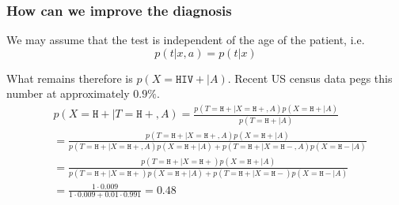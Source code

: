 \documentclass[notheorems, aspectratio=54]{beamer}
\def\parchmentframe#1{
		\tikz{
			\node[inner sep=1em] (A) {#1};  %
			\begin{pgfonlayer}{background}  %
				\fill[normal border] 
				(A.south east) -- (A.south west) -- 
				(A.north west) -- (A.north east) -- cycle;
	\end{pgfonlayer}}}
\def\parchmentframetop#1{
		\tikz{
			\node[inner sep=2em] (A) {#1};    %
			\begin{pgfonlayer}{background}    
				\fill[normal border]              %
				(A.south east) -- (A.south west) -- 
				(A.north west) -- (A.north east) -- cycle;
				\fill[torn border]                %
				($(A.south east)-(0,.2)$) -- ($(A.south west)-(0,.2)$) -- 
				($(A.south west)+(0,.2)$) -- ($(A.south east)+(0,.2)$) -- cycle;
	\end{pgfonlayer}}}
\def\parchmentframebottom#1{
		\tikz{
			\node[inner sep=2em] (A) {#1};   %
			\begin{pgfonlayer}{background}   
				\fill[normal border]             %
				(A.south east) -- (A.south west) -- 
				(A.north west) -- (A.north east) -- cycle;
				\fill[torn border]               %
				($(A.north east)-(0,.2)$) -- ($(A.north west)-(0,.2)$) -- 
				($(A.north west)+(0,.2)$) -- ($(A.north east)+(0,.2)$) -- cycle;
	\end{pgfonlayer}}}
\def\parchmentframemiddle#1{
		\tikz{
			\node[inner sep=2em] (A) {#1};   %
			\begin{pgfonlayer}{background}   
				\fill[normal border]             %
				(A.south east) -- (A.south west) -- 
				(A.north west) -- (A.north east) -- cycle;
				\fill[torn border]               %
				($(A.south east)-(0,.2)$) -- ($(A.south west)-(0,.2)$) -- 
				($(A.south west)+(0,.2)$) -- ($(A.south east)+(0,.2)$) -- cycle;
				\fill[torn border]               %
				($(A.north east)-(0,.2)$) -- ($(A.north west)-(0,.2)$) -- 
				($(A.north west)+(0,.2)$) -- ($(A.north east)+(0,.2)$) -- cycle;
	\end{pgfonlayer}}}
\newenvironment{parchment}[1][Example]{%
		\def\FrameCommand{\parchmentframe}%
		\def\FirstFrameCommand{\parchmentframetop}%
		\def\LastFrameCommand{\parchmentframebottom}%
		\def\MidFrameCommand{\parchmentframemiddle}%
		\vskip\baselineskip
		\MakeFramed {\FrameRestore}
		\noindent\tikz\node[inner sep=1ex, draw=black, fill=seagull,
		anchor=west, overlay] at (0em, 1em) {\sffamily#1};\par}%
	{\endMakeFramed}
\begin{document}
		
		
		
		\begin{frame}
			\frametitle{How can we improve the diagnosis}
			
			We may assume that the test is independent of the age of the patient, i.e.
			$$
			p(t|x,a) = p(t|x)
			$$
			
			What remains therefore is $p(X = \mathtt{HIV+}|A)$. Recent US census data pegs this number at approximately $0.9\%$. 
			\begin{align}
				\nonumber & p(X = \mathtt{H+}|T = \mathtt{H+}, A) = \frac{p(T=\mathtt{H+}|X=\mathtt{H+},A)p(X=\mathtt{H+}|A)}{p(T=\mathtt{H+}|A)} \\
				\nonumber &= \frac{p(T=\mathtt{H+}|X=\mathtt{H+},A)p(X=\mathtt{H+}|A)}{p(T=\mathtt{H+}|X=\mathtt{H+},A)p(X=\mathtt{H+}|A) + p(T=\mathtt{H+}|X=\mathtt{H-},A)p(X=\mathtt{H-}|A)} \\
				\nonumber & = \frac{p(T=\mathtt{H+}|X=\mathtt{H+})p(X=\mathtt{H+}|A)}{p(T=\mathtt{H+}|X=\mathtt{H+})p(X=\mathtt{H+}|A) + p(T=\mathtt{H+}|X=\mathtt{H-})p(X=\mathtt{H-}|A)} \\
				\nonumber & = \frac{1 \cdot 0.009}{1 \cdot 0.009 + 0.01 \cdot 0.991} = 0.48
			\end{align}
			
		\end{frame}
		
\end{document}
